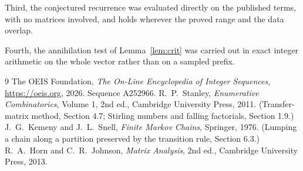 \documentclass[11pt,a4paper]{article}
\theoremstyle{plain}
\theoremstyle{definition}
\begin{document}
Third, the conjectured recurrence was evaluated directly on the published terms, with no
matrices involved, and holds wherever the proved range and the data overlap.

Fourth, the annihilation test of Lemma~\ref{lem:crit} was carried out in exact integer
arithmetic on the whole vector rather than on a sampled prefix.

\begin{thebibliography}{9}
 The OEIS Foundation, \emph{The On-Line Encyclopedia of Integer
Sequences}, \url{https://oeis.org}, 2026. Sequence A252966.
 R.~P.~Stanley, \emph{Enumerative Combinatorics}, Volume 1, 2nd ed.,
Cambridge University Press, 2011. (Transfer-matrix method, Section 4.7; Stirling numbers and
falling factorials, Section 1.9.)
 J.~G.~Kemeny and J.~L.~Snell, \emph{Finite Markov Chains}, Springer,
1976. (Lumping a chain along a partition preserved by the transition rule, Section 6.3.)
 R.~A.~Horn and C.~R.~Johnson, \emph{Matrix Analysis}, 2nd ed., Cambridge
University Press, 2013.
\end{thebibliography}
\end{document}
